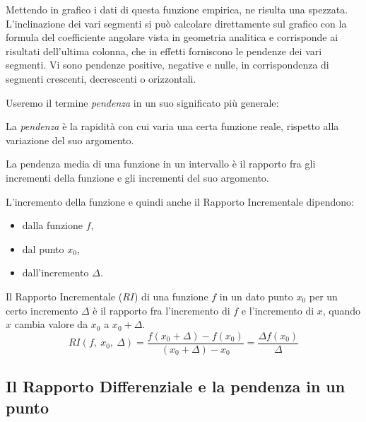 \begin{esempio}
Mettendo in grafico i dati di questa funzione empirica, ne risulta una 
spezzata. 
L'inclinazione dei vari segmenti si può calcolare direttamente sul 
grafico con la formula del coefficiente angolare vista in geometria 
analitica e corrisponde ai risultati dell'ultima colonna, 
che in effetti forniscono le pendenze dei vari segmenti. 
Vi sono pendenze positive, negative e nulle, in 
corrispondenza di segmenti crescenti, decrescenti o orizzontali. 
\end{esempio}


Useremo il termine \emph{pendenza} in un suo significato più generale:
\begin{definizione}
La \emph{pendenza} è la rapidità con cui varia una certa funzione reale, 
rispetto alla variazione del suo argomento. 
\end{definizione}

La pendenza media di una funzione in un intervallo è il 
rapporto fra gli incrementi della funzione e gli incrementi del suo argomento. 

L'incremento della funzione e quindi anche il Rapporto Incrementale 
dipendono: 
\begin{multicols}{3}
\begin{itemize} [nosep]
\item dalla funzione \(f\), 
\item dal punto \(x_0\), 
\item dall'incremento \(\Delta\).
\end{itemize}
\end{multicols}
\begin{definizione}
Il Rapporto Incrementale (\(RI\)) 
di una funzione \(f\) 
in un dato punto \(x_0\)
per un certo incremento \(\Delta\)
è il rapporto 
fra l'incremento di \(f\) e l'incremento di \(x\), quando \(x\) 
cambia valore da \(x_0\) a \(x_0+\Delta\).
\[RI(f,~x_0,~\Delta) = 
  \frac{f(x_0+\Delta)-f(x_0)}{(x_0+\Delta)- x_0}=
  \frac{\Delta f(x_0)}{\Delta}\]
\end{definizione}

\subsection{Il Rapporto Differenziale e la pendenza in un punto}
\label{subsubsec:RD}

